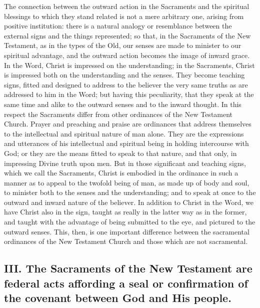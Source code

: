 \documentclass[]{book}
\begin{document}
The connection between the outward action in the Sacraments and the spiritual blessings to which they stand related is not a mere arbitrary one, arising from positive institution: there is a natural analogy or resemblance between the external signs and the things represented; so that, in the Sacraments of the New Testament, as in the types of the Old, our senses are made to minister to our spiritual advantage, and the outward action becomes the image of inward grace. In the Word, Christ is impressed on the understanding; in the Sacraments, Christ is impressed both on the understanding and the senses. They become teaching signs, fitted and designed to address to the believer the very same truths as are addressed to him in the Word; but having this peculiarity, that they speak at the same time and alike to the outward senses and to the inward thought. In this respect the Sacraments differ from other ordinances of the New Testament Church. Prayer and preaching and praise are ordinances that address themselves to the intellectual and spiritual nature of man alone. They are the expressions and utterances of his intellectual and spiritual being in holding intercourse with God; or they are the means fitted to speak to that nature, and that only, in impressing Divine truth upon men. But in those significant and teaching signs, which we call the Sacraments, Christ is embodied in the ordinance in such a manner as to appeal to the twofold being of man, as made up of body and soul, to minister both to the senses and the understanding; and to speak at once to the outward and inward nature of the believer. In addition to Christ in the Word, we have Christ also in the sign, taught as really in the latter way as in the former, and taught with the advantage of being submitted to the eye, and pictured to the outward senses. This, then, is one important difference between the sacramental ordinances of the New Testament Church and those which are not sacramental.

\hypertarget{iii.-the-sacraments-of-the-new-testament-are-federal-acts-affording-a-seal-or-confirmation-of-the-covenant-between-god-and-his-people.}{%
\subsection{III. The Sacraments of the New Testament are federal acts affording a seal or confirmation of the covenant between God and His people.}\label{iii.-the-sacraments-of-the-new-testament-are-federal-acts-affording-a-seal-or-confirmation-of-the-covenant-between-god-and-his-people.}}
\end{document}
